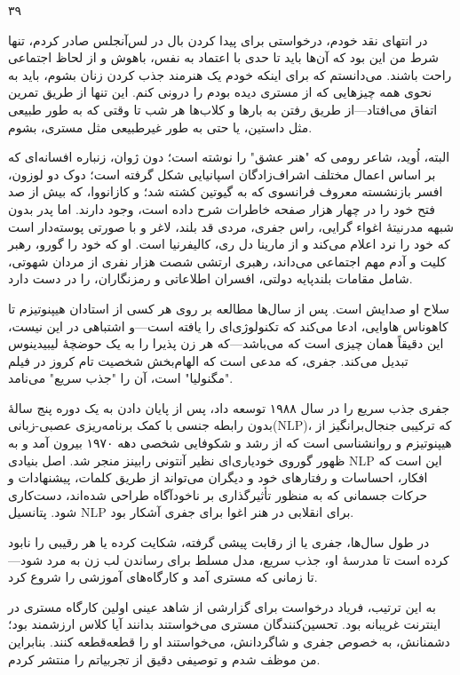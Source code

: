 ۳۹

در انتهای نقد خودم، درخواستی برای پیدا کردن بال در لس‌آنجلس صادر کردم، تنها شرط من این بود که آن‌ها باید تا حدی با اعتماد به نفس، باهوش و از لحاظ اجتماعی راحت باشند. می‌دانستم که برای اینکه خودم یک هنرمند جذب کردن زنان بشوم، باید به نحوی همه چیزهایی که از مستری دیده بودم را درونی کنم. این تنها از طریق تمرین اتفاق می‌افتاد—از طریق رفتن به بارها و کلاب‌ها هر شب تا وقتی که به طور طبیعی مثل داستین، یا حتی به طور غیرطبیعی مثل مستری، بشوم.

البته، اُوید، شاعر رومی که "هنر عشق" را نوشته است؛ دون ژوان، زنباره افسانه‌ای که بر اساس اعمال مختلف اشراف‌زادگان اسپانیایی شکل گرفته است؛ دوک دو لوزون، افسر بازنشسته معروف فرانسوی که به گیوتین کشته شد؛ و کازانووا، که بیش از صد فتح خود را در چهار هزار صفحه خاطرات شرح داده است، وجود دارند. اما پدر بدون شبهه مدرنیتهٔ اغواء گرایی، راس جفری، مردی قد بلند، لاغر و با صورتی پوسته‌دار است که خود را نرد اعلام می‌کند و از مارینا دل ری، کالیفرنیا است. او که خود را گورو، رهبر کلیت و آدم مهم اجتماعی می‌داند، رهبری ارتشی شصت هزار نفری از مردان شهوتی، شامل مقامات بلندپایه دولتی، افسران اطلاعاتی و رمزنگاران، را در دست دارد.

سلاح او صدایش است. پس از سال‌ها مطالعه بر روی هر کسی از استادان هیپنوتیزم تا کاهوناس هاوایی، ادعا می‌کند که تکنولوژی‌ای را یافته است—و اشتباهی در این نیست، این دقیقاً همان چیزی است که می‌باشد—که هر زن پذیرا را به یک حوضچهٔ لیبیدینوس تبدیل می‌کند. جفری، که مدعی است که الهام‌بخش شخصیت تام کروز در فیلم "مگنولیا" است، آن را "جذب سریع" می‌نامد.

جفری جذب سریع را در سال ۱۹۸۸ توسعه داد، پس از پایان دادن به یک دوره پنج سالهٔ بدون رابطه جنسی با کمک برنامه‌ریزی عصبی-زبانی(NLP)، که ترکیبی جنجال‌برانگیز از هیپنوتیزم و روانشناسی است که از رشد و شکوفایی شخصی دهه ۱۹۷۰ بیرون آمد و به ظهور گوروی خودیاری‌ای نظیر آنتونی رابینز منجر شد. اصل بنیادی NLP این است که افکار، احساسات و رفتارهای خود و دیگران می‌تواند از طریق کلمات، پیشنهادات و حرکات جسمانی که به منظور تأثیرگذاری بر ناخودآگاه طراحی شده‌اند، دست‌کاری شود. پتانسیل NLP برای انقلابی در هنر اغوا برای جفری آشکار بود.

در طول سال‌ها، جفری یا از رقابت پیشی گرفته، شکایت کرده یا هر رقیبی را نابود کرده است تا مدرسهٔ او، جذب سریع، مدل مسلط برای رساندن لب زن به مرد شود—تا زمانی که مستری آمد و کارگاه‌های آموزشی را شروع کرد.

به این ترتیب، فریاد درخواست برای گزارشی از شاهد عینی اولین کارگاه مستری در اینترنت غریبانه بود. تحسین‌کنندگان مستری می‌خواستند بدانند آیا کلاس ارزشمند بود؛ دشمنانش، به خصوص جفری و شاگردانش، می‌خواستند او را قطعه‌قطعه کنند. بنابراین من موظف شدم و توصیفی دقیق از تجربیاتم را منتشر کردم.